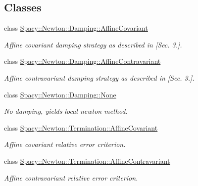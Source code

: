 \subsection*{Classes}
\begin{DoxyCompactItemize}
\item 
class \hyperlink{classSpacy_1_1Newton_1_1Damping_1_1AffineCovariant}{Spacy\+::\+Newton\+::\+Damping\+::\+Affine\+Covariant}
\begin{DoxyCompactList}\small\item\em Affine covariant damping strategy as described in \cite{Deuflhard2004} \mbox{[}Sec. 3.\mbox{]}. \end{DoxyCompactList}\item 
class \hyperlink{classSpacy_1_1Newton_1_1Damping_1_1AffineContravariant}{Spacy\+::\+Newton\+::\+Damping\+::\+Affine\+Contravariant}
\begin{DoxyCompactList}\small\item\em Affine contravariant damping strategy as described in \cite{Deuflhard2004} \mbox{[}Sec. 3.\mbox{]}. \end{DoxyCompactList}\item 
class \hyperlink{classSpacy_1_1Newton_1_1Damping_1_1None}{Spacy\+::\+Newton\+::\+Damping\+::\+None}
\begin{DoxyCompactList}\small\item\em No damping, yields local newton method. \end{DoxyCompactList}\item 
class \hyperlink{classSpacy_1_1Newton_1_1Termination_1_1AffineCovariant}{Spacy\+::\+Newton\+::\+Termination\+::\+Affine\+Covariant}
\begin{DoxyCompactList}\small\item\em Affine covariant relative error criterion. \end{DoxyCompactList}\item 
class \hyperlink{classSpacy_1_1Newton_1_1Termination_1_1AffineContravariant}{Spacy\+::\+Newton\+::\+Termination\+::\+Affine\+Contravariant}
\begin{DoxyCompactList}\small\item\em Affine contravariant relative error criterion. \end{DoxyCompactList}\end{DoxyCompactItemize}
